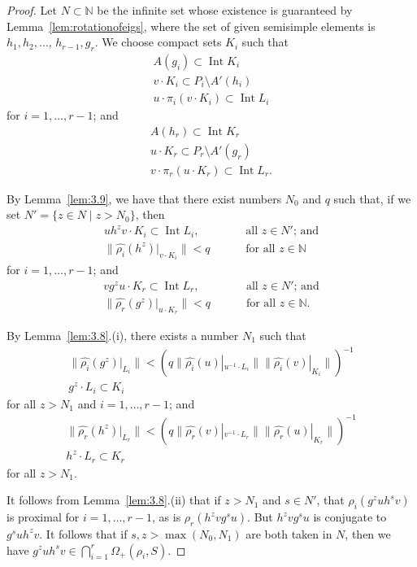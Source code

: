 \documentclass{amsart}
\theoremstyle{plain}
\theoremstyle{definition}
\theoremstyle{remark}
\DeclareMathOperator{\Int}{Int}
\providecommand{\norm}[1]{\lVert#1\rVert}
\begin{document}
\begin{proof}
 Let $N \subset \mathbb{N}$ be the infinite set whose existence is guaranteed by
 Lemma~\ref{lem:rotationofeigs}, where the set of given semisimple elements is 
 $h_{1}, h_{2},\ldots$, $h_{r-1}, g_{r}$. We choose compact sets $K_{i}$ such that
 \begin{gather*}
 A(g_{i}) \subset \Int K_{i}\\
 v\cdot K_{i} \subset P_{i}\setminus A'(h_{i}) \\
 u\cdot \pi_{i}(v\cdot K_{i})\subset \Int L_{i}
\end{gather*}
for $i = 1,\ldots, r-1$; and 
\begin{gather*}
 A(h_{r}) \subset \Int K_{r}\\
u\cdot K_{r} \subset P_{r}\setminus A'(g_{r}) \\
 v\cdot \pi_{r}(u\cdot K_{r})\subset \Int L_{r}.
\end{gather*}



By Lemma~\ref{lem:3.9}, we have that there exist numbers $N_{0}$ and $q$ such that,
if we set $N' = \{z \in N\mid z>N_{0}\}$, then
\begin{align*}
uh^{z}v\cdot K_{i} \subset \Int L_{i},&\qquad \text{ all $z \in N'$; and}\\
\norm{\widehat{\rho_{i}}(h^{z}) |_{v\cdot K_{i}}} < q &\qquad \text{ for all $z\in \mathbb{N}$}
\end{align*}
for $i = 1,\ldots, r-1$; and 
\begin{align*}
vg^{z}u\cdot K_{r} \subset \Int L_{r},&\qquad \text{ all $z \in N'$; and}\\
\norm{\widehat{\rho_{r}}(g^{z}) |_{u\cdot K_{r}}} < q &\qquad \text{ for all $z\in
\mathbb{N}$}.
\end{align*}

By Lemma~\ref{lem:3.8}.(i), there exists a number $N_{1}$ such that
\begin{gather*}
\norm{\widehat{\rho_{i}}(g^{z})|_{L_{i}}} < (q\norm{\widehat{\rho_{i}}(u)|_{u^{-1}\cdot L_{i}}}
\norm{\widehat{\rho_{i}}(v)|_{K_{i}}})^{-1}\\
g^{z}\cdot L_{i} \subset K_{i}
\end{gather*}
for all $z>N_{1}$ and $i = 1,\ldots, r-1$; and 
\begin{gather*}
\norm{\widehat{\rho_{r}}(h^{z})|_{L_{r}}} < (q\norm{\widehat{\rho_{r}}(v)|_{v^{-1}\cdot L_{r}}}
\norm{\widehat{\rho_{r}}(u)|_{K_{r}}})^{-1}\\
h^{z}\cdot L_{r} \subset K_{r}
\end{gather*}
for all $z>N_{1}$.

It follows from Lemma~\ref{lem:3.8}.(ii) that if
$z > N_{1}$ and $s \in N'$, that $\rho_{i}(g^{z}uh^{s}v)$ is proximal for
$i=1,\ldots,r-1$, as is $\rho_{r}(h^{z}vg^{s}u)$. But $h^{z}vg^{s}u$ is conjugate
to $g^{s}uh^{z}v$. It follows that if $s, z > \max(N_{0}, N_{1})$ are both taken in $N$,
then we have $g^{z}uh^{s}v \in \bigcap_{i=1}^{r}\Omega_{+}(\rho_{i}, S)$.
\end{proof}
\end{document}
